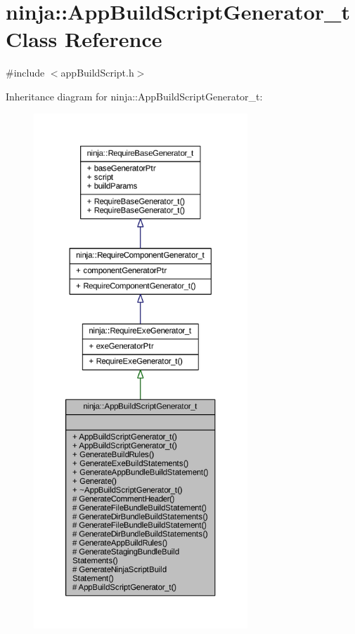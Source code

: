 \hypertarget{classninja_1_1_app_build_script_generator__t}{}\section{ninja\+:\+:App\+Build\+Script\+Generator\+\_\+t Class Reference}
\label{classninja_1_1_app_build_script_generator__t}


{\ttfamily \#include $<$app\+Build\+Script.\+h$>$}



Inheritance diagram for ninja\+:\+:App\+Build\+Script\+Generator\+\_\+t\+:
\nopagebreak
\begin{figure}[H]
\begin{center}
\leavevmode
\includegraphics[height=550pt]{classninja_1_1_app_build_script_generator__t__inherit__graph}
\end{center}
\end{figure}


